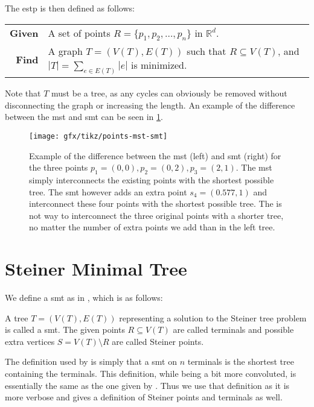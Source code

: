 The \ac{estp} is then defined as follows:
%
\begin{center}
  \begin{tabular}{rp{9cm}}
    \toprule
    \textbf{Given} & A set of points $R = \{ p_1, p_2, \ldots, p_n \}$ in
                     $\mathbb{R}^d$. \\
    \textbf{Find} & A graph $T = (V(T), E(T))$ such that $R \subseteq V(T)$, and
                    $|T| = \sum_{e \in E(T)} |e|$ is minimized. \\
    \bottomrule
  \end{tabular}
\end{center}
%
Note that $T$ must be a tree, as any cycles can obviously be removed without
disconnecting the graph or increasing the length. An example of the difference
between the \ac{mst} and \ac{smt} can be seen in \cref{fig:points-mst-smt}.
%
\begin{figure}[htbp]
  \centering
  \texttt{[image: gfx/tikz/points-mst-smt]}
  \caption[\acs{mst} vs. \acs{smt}]{Example of the difference between the \acs{mst} (left)
    and \acs{smt} (right) for the three points $p_1 = (0,0), p_2 = (0, 2), p_3 = (2,
    1)$. The \acs{mst} simply interconnects the existing points with the shortest
    possible tree. The \acs{smt} however adds an extra point $s_4 = (0.577, 1)$
    and interconnect these four points with the shortest possible tree. The is
    not way to interconnect the three original points with a shorter tree, no
    matter the number of extra points we add than in the left
    tree.\label{fig:points-mst-smt}}
\end{figure}

\section{Steiner Minimal Tree}
\label{sec:steiner-minimal-tree}

We define a \ac{smt} as in \textcite{brazil2015}, which is as follows:
%
\begin{definition}
  A tree $T = (V(T), E(T))$ representing a solution to the Steiner tree problem
  is called a \acl{smt}. The given points $R \subseteq V(T)$ are called
  terminals and possible extra vertices $S = V(T) \setminus R$ are called
  Steiner points.
\end{definition}
%
The definition used by \textcite{smith1992} is simply that a \ac{smt} on $n$
terminals is the shortest tree containing the terminals. This definition, while being
a bit more convoluted, is essentially the same as the one given by
\textcite{brazil2015}. Thus we use that definition as it is more verbose and
gives a definition of Steiner points and terminals as well.


